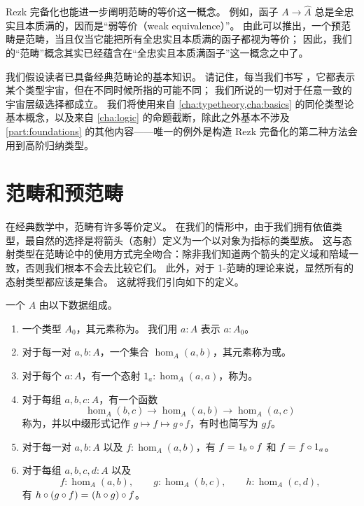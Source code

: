 Rezk 完备化也能进一步阐明范畴的等价这一概念。
例如，函子 $A \to \widehat{A}$ 总是全忠实且本质满的，因而是``弱等价（weak equivalence）''。
由此可以推出，一个预范畴是范畴，当且仅当它能把所有全忠实且本质满的函子都视为等价；
因此，我们的``范畴''概念其实已经蕴含在``全忠实且本质满函子''这一概念之中了。

我们假设读者已具备经典范畴论的基本知识。
请记住，每当我们书写 \type，它都表示某个类型宇宙，但在不同时候所指的可能不同；
我们所说的一切对于任意一致的宇宙层级选择都成立。
我们将使用来自 \cref{cha:typetheory,cha:basics} 的同伦类型论基本概念，以及来自 \cref{cha:logic} 的命题截断，除此之外基本不涉及 \cref{part:foundations} 的其他内容——唯一的例外是构造 Rezk 完备化的第二种方法会用到高阶归纳类型。

\section{范畴和预范畴}
\label{sec:cats}

在经典数学中，范畴有许多等价定义。
在我们的情形中，由于我们拥有依值类型，最自然的选择是将箭头（态射）定义为一个以对象为指标的类型族。
这与态射类型在范畴论中的使用方式完全吻合：除非我们知道两个箭头的定义域和陪域一致，否则我们根本不会去比较它们。
此外，对于 1-范畴的理论来说，显然所有的态射类型都应该是集合。
这就将我们引向如下的定义。

\begin{defn}\label{ct:precategory}
  一个
  $A$ 由以下数据组成。
  \begin{enumerate}
  \item 一个类型 $A_0$，其元素称为。%
    我们用 $a:A$ 表示 $a:A_0$。
  \item 对于每一对 $a,b:A$，一个集合 $\hom_A(a,b)$，其元素称为或。%
  \item 对于每个 $a:A$，有一个态射 $1_a:\hom_A(a,a)$，称为。%
  \item 对于每组 $a,b,c:A$，有一个函数%
    \[  \hom_A(b,c) \to \hom_A(a,b) \to \hom_A(a,c) \]
    称为，并以中缀形式记作 $g\mapsto f\mapsto g\circ f$，有时也简写为 $gf$。
  \item 对于每一对 $a,b:A$ 以及 $f:\hom_A(a,b)$，有 $f =_{} 1_b\circ f$ 和 $f =_{} f\circ 1_a$。
  \item 对于每组 $a,b,c,d:A$ 以及
    \begin{equation*}
      f:\hom_A(a,b), \qquad
      g:\hom_A(b,c), \qquad
      h:\hom_A(c,d),
    \end{equation*}
    有 $h\circ (g\circ f) =_{} (h\circ g)\circ f$。
  \end{enumerate}
\end{defn}

